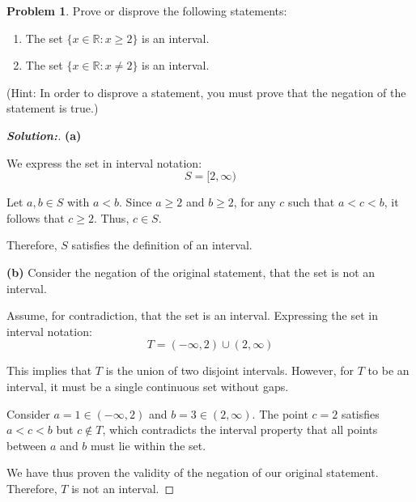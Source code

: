 \documentclass[12pt]{article}
\theoremstyle{definition}\newtheorem{problem}{Problem}
\newenvironment{solution}{\begin{proof}[\bfseries\textup{Solution:}]}{\end{proof}}
\newcommand{\R}{\mathbb{R}}
\begin{document}
\newpage
\begin{problem}
Prove or disprove the following statements:
\begin{enumerate}
\item The set $\{ x\in\R : x\geq 2 \}$ is an interval.
\item The set $\{ x\in\R : x\neq 2 \}$ is an interval.
\end{enumerate}
(Hint:  In order to disprove a statement, you must prove that the negation of the statement is true.)
\end{problem}
\begin{solution}
  \textbf{(a)}

    We express the set in interval notation:
    $$
    S = [2, \infty)
    $$
    
    
    Let \( a, b \in S \) with \( a < b \). Since \( a \geq 2 \) and \( b \geq 2 \), for any \( c \) such that \( a < c < b \), it follows that \( c \geq 2 \). Thus, \( c \in S \).
    
    Therefore, \( S \) satisfies the definition of an interval.
    
    \textbf{(b)} Consider the negation of the original statement, that the set is not an interval. 
    
    Assume, for contradiction, that the set is an interval. Expressing the set in interval notation:
    $$
    T = (-\infty, 2) \cup (2, \infty)
    $$
    
    This implies that \( T \) is the union of two disjoint intervals. However, for \( T \) to be an interval, it must be a single continuous set without gaps. 
    
    Consider \( a = 1 \in (-\infty, 2) \) and \( b = 3 \in (2, \infty) \). The point \( c = 2 \) satisfies \( a < c < b \) but \( c \notin T \), which contradicts the interval property that all points between \( a \) and \( b \) must lie within the set.
    
    We have thus proven the validity of the negation of our original statement. Therefore, \( T \) is not an interval.    

\end{solution}
\end{document}
